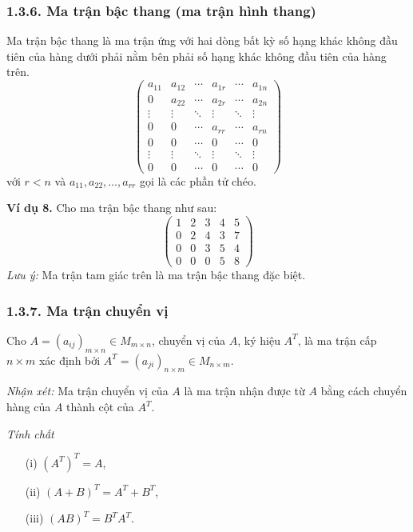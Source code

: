 \subsubsection*{1.3.6. Ma trận bậc thang (ma trận hình thang)}
Ma trận bậc thang là ma trận ứng với hai dòng bất kỳ số hạng khác không đầu tiên của hàng dưới phải nằm bên phải số hạng khác không đầu tiên của hàng trên.
\[
\begin{pmatrix}
a_{11} & a_{12} & \cdots & a_{1r} & \cdots & a_{1n} \\
0 & a_{22} & \cdots & a_{2r} & \cdots & a_{2n} \\
\vdots & \vdots & \ddots & \vdots & \ddots & \vdots \\
0 & 0 & \cdots & a_{rr} & \cdots & a_{rn} \\
0 & 0 & \cdots & 0 & \cdots & 0 \\
\vdots & \vdots & \ddots & \vdots & \ddots & \vdots \\
0 & 0 & \cdots & 0 & \cdots & 0
\end{pmatrix}
\]
với \( r < n \) và \( a_{11}, a_{22}, \ldots, a_{rr} \) gọi là các phần tử chéo.

\textbf{Ví dụ 8.} Cho ma trận bậc thang như sau:
\[
\begin{pmatrix}
1 & 2 & 3 & 4 & 5 \\
0 & 2 & 4 & 3 & 7 \\
0 & 0 & 3 & 5 & 4 \\
0 & 0 & 0 & 5 & 8
\end{pmatrix}
\]
\textit{Lưu ý:} Ma trận tam giác trên là ma trận bậc thang đặc biệt.

\subsubsection*{1.3.7. Ma trận chuyển vị}
Cho \( A = (a_{ij})_{m \times n} \in M_{m \times n} \), chuyển vị của \( A \), ký hiệu \( A^T \), là ma trận cấp \( n \times m \) xác định bởi \( A^T = (a_{ji})_{n \times m} \in M_{n \times m} \).

\textit{Nhận xét:} Ma trận chuyển vị của \( A \) là ma trận nhận được từ \( A \) bằng cách chuyển hàng của \( A \) thành cột của \( A^T \).

\textit{Tính chất}
\begin{itemize}
    \item[(i)] \( (A^T)^T = A \),
    \item[(ii)] \( (A + B)^T = A^T + B^T \),
    \item[(iii)] \( (AB)^T = B^T A^T \).
\end{itemize}

